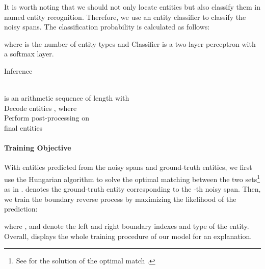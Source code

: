 \documentclass[11pt]{article}
\begin{document}
It is worth noting that we should not only locate entities but also classify them in named entity recognition. Therefore, we use an entity classifier to classify the noisy spans. The classification probability  is calculated as follows:

\noindent where  is the number of entity types and Classifier is a two-layer perceptron with a softmax layer.





\begin{algorithm}[t]
\small
 \caption{Inference}
 \label{alg:inference}
 \\
  is an arithmetic sequence of length  with \\
 Decode entities , where  \\
Perform post-processing on  \\
 \Return final entities
\end{algorithm}


\paragraph{Training Objective} 
With  entities predicted from the noisy spans and  ground-truth entities, we first use the Hungarian algorithm \citep{kuhn1955hungarian} to solve the optimal matching  between the two sets\footnote{\;See  for the solution of the optimal match .} as in \citet{detr}.  denotes the ground-truth entity corresponding to the -th noisy span. Then, we train the boundary reverse process by maximizing the likelihood of the prediction:


\noindent where ,  and  denote the left and right boundary indexes and type of the  entity. Overall,  displays the whole training procedure of our model for an explanation.
\end{document}
